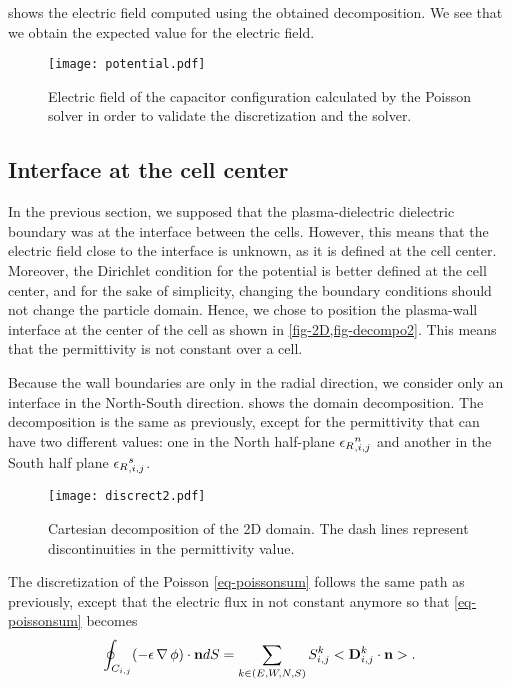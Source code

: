      shows the electric field computed using the obtained decomposition.
    We see that we obtain the expected value for the electric field.

    \begin{figure}[hbtp]
      \centering
      \texttt{[image: potential.pdf]}
      \caption{Electric field of the capacitor configuration calculated by the Poisson solver in order to validate the discretization and the solver. }
      \label{fig-surface}
    \end{figure}


  \subsection{Interface at the cell center}
    In the previous section, we supposed that the plasma-dielectric dielectric boundary was at the interface between the cells.
    However, this means that the electric field close to the interface is unknown, as it is defined at the cell center.
    Moreover, the Dirichlet condition for the potential is better defined at the cell center, and for the sake of simplicity, changing the boundary conditions should not change the particle domain.
    Hence, we chose to position the plasma-wall interface at the center of the cell as shown in \cref{fig-2D,fig-decompo2}.
    This means that the permittivity is not constant over a cell.

    Because the wall boundaries are only in the radial direction, we consider only an interface in the North-South direction.
     shows the domain decomposition.
    The decomposition is the same as previously, except for the permittivity that can have two different values\string: one in the North half-plane ${\epsilon_{R}}_{, i,j}^n$ and another in the South half plane ${\epsilon_{R}}_{, i,j}^s$.

    \begin{figure}[hbt]
      \centering
      \texttt{[image: discrect2.pdf]}
      \caption{Cartesian decomposition of the \ac{2D} domain. The dash lines represent discontinuities in the permittivity value.}
      \label{fig-decompo2}
    \end{figure}

    The discretization of the Poisson \cref{eq-poissonsum} follows the same path as previously, except that the electric flux in not constant anymore so that \cref{eq-poissonsum} becomes
    \begin{equation}
    \oint_{C_{i,j}} (-\epsilon \operatorname{{\mathbf \nabla}} \phi) \cdot {\mathbf n} dS = \sum_{k\in(E,W,N,S)} S^k_{i,j} <{\mathbf D}^k_{i,j} \cdot {\mathbf n}>.
    \end{equation}

